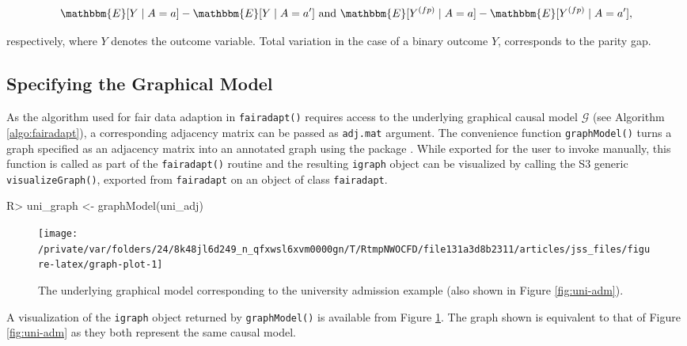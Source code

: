 \documentclass[
  nojss]{jss}
\begin{document}
\[\mathbbm{E}[Y \mid A = a] - \mathbbm{E}[Y \mid A = a'] \text{ and } \mathbbm{E}[ {Y}^{(fp)} \mid A = a] - \mathbbm{E}[ {Y}^{(fp)} \mid A = a'],\]

respectively, where \(Y\) denotes the outcome variable. Total variation
in the case of a binary outcome \(Y\), corresponds to the parity gap.

\hypertarget{specifying-the-graphical-model}{%
\subsection{Specifying the Graphical
Model}\label{specifying-the-graphical-model}}

As the algorithm used for fair data adaption in \texttt{fairadapt()}
requires access to the underlying graphical causal model \(\mathcal{G}\)
(see Algorithm \ref{algo:fairadapt}), a corresponding adjacency matrix
can be passed as \texttt{adj.mat} argument. The convenience function
\texttt{graphModel()} turns a graph specified as an adjacency matrix
into an annotated graph using the  package
\citep{csardi2006igraph}. While exported for the user to invoke
manually, this function is called as part of the \texttt{fairadapt()}
routine and the resulting \texttt{igraph} object can be visualized by
calling the S3 generic \texttt{visualizeGraph()}, exported from
\texttt{fairadapt} on an object of class \texttt{fairadapt}.

\begin{CodeChunk}
\begin{CodeInput}
R> uni_graph <- graphModel(uni_adj)
\end{CodeInput}
\end{CodeChunk}

\begin{CodeChunk}
\begin{figure}

{\centering \texttt{[image: /private/var/folders/24/8k48jl6d249\_n\_qfxwsl6xvm0000gn/T/RtmpNWOCFD/file131a3d8b2311/articles/jss\_files/figure-latex/graph-plot-1]} 

}

\caption{The underlying graphical model corresponding to the university admission example (also shown in Figure \ref{fig:uni-adm}).}\label{fig:graph-plot}
\end{figure}
\end{CodeChunk}

A visualization of the \texttt{igraph} object returned by
\texttt{graphModel()} is available from Figure \ref{fig:graph-plot}. The
graph shown is equivalent to that of Figure \ref{fig:uni-adm} as they
both represent the same causal model.
\end{document}
